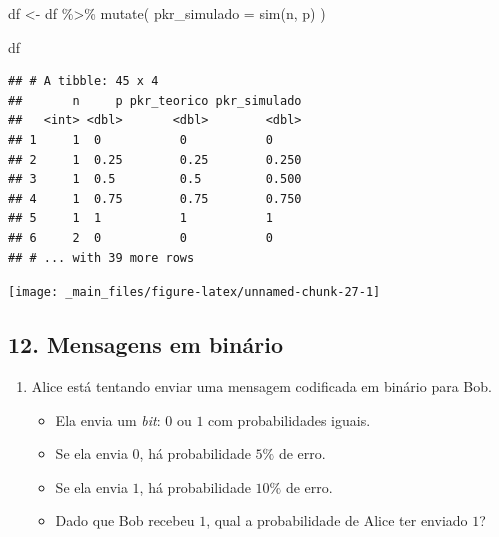 \documentclass[
  11pt]{report}
\newenvironment{Shaded}{\begin{snugshade}}{\end{snugshade}}
\newcommand{\AttributeTok}[1]{\textcolor[rgb]{0.77,0.63,0.00}{#1}}
\newcommand{\FunctionTok}[1]{\textcolor[rgb]{0.00,0.00,0.00}{#1}}
\newcommand{\NormalTok}[1]{#1}
\newcommand{\OtherTok}[1]{\textcolor[rgb]{0.56,0.35,0.01}{#1}}
\newcommand{\SpecialCharTok}[1]{\textcolor[rgb]{0.00,0.00,0.00}{#1}}
\renewenvironment{Shaded}{
    \begin{mdframed}[%
      roundcorner=2pt,%
      innerleftmargin=5pt,%
      innerrightmargin=5pt,%
      topline=true,%
      leftline=true,%
      rightline=true,%
      bottomline=true,%
      linewidth=0.5pt,%
      linecolor=black!20,%
      backgroundcolor=black!2,%
      skipabove=2ex,%
      skipbelow=2.5ex%
    ]%
  }
  {
    \end{mdframed}
  }
\begin{document}
\begin{Shaded}
\begin{Highlighting}[]
\NormalTok{df }\OtherTok{\textless{}{-}}\NormalTok{ df }\SpecialCharTok{\%\textgreater{}\%} 
  \FunctionTok{mutate}\NormalTok{(}
    \AttributeTok{pkr\_simulado =} \FunctionTok{sim}\NormalTok{(n, p)}
\NormalTok{  )}

\NormalTok{df}
\end{Highlighting}
\end{Shaded}

\begin{verbatim}
## # A tibble: 45 x 4
##       n     p pkr_teorico pkr_simulado
##   <int> <dbl>       <dbl>        <dbl>
## 1     1  0           0           0    
## 2     1  0.25        0.25        0.250
## 3     1  0.5         0.5         0.500
## 4     1  0.75        0.75        0.750
## 5     1  1           1           1    
## 6     2  0           0           0    
## # ... with 39 more rows
\end{verbatim}

\begin{center}\texttt{[image: \_main\_files/figure-latex/unnamed-chunk-27-1]} \end{center}

\hypertarget{mensagens-em-binuxe1rio}{%
\subsection*{12. Mensagens em binário}\label{mensagens-em-binuxe1rio}}

\begin{rmdbox}

\begin{enumerate}
\def\labelenumi{\alph{enumi}.}
\item
  Alice está tentando enviar uma mensagem codificada em binário para Bob.

  \begin{itemize}
  \item
    Ela envia um \emph{bit}: $0$ ou $1$ com probabilidades iguais.
  \item
    Se ela envia $0$, há probabilidade $5\%$ de erro.
  \item
    Se ela envia $1$, há probabilidade $10\%$ de erro.
  \item
    Dado que Bob recebeu $1$, qual a probabilidade de Alice ter enviado $1$?
  \end{itemize}
\end{enumerate}

\end{rmdbox}
\end{document}
